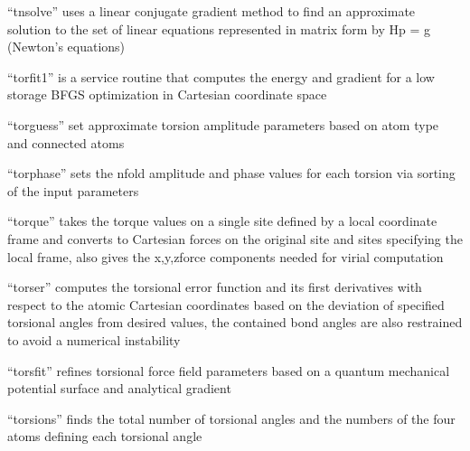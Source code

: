 \documentclass[letterpaper,11pt,english]{sphinxmanual}
\begin{document}
\sphinxAtStartPar
{}

\sphinxAtStartPar
“tnsolve” uses a linear conjugate gradient method to find an approximate solution to the set of linear equations represented in matrix form by Hp = \sphinxhyphen{}g (Newton’s equations)

\sphinxAtStartPar
{}

\sphinxAtStartPar
“torfit1” is a service routine that computes the energy and gradient for a low storage BFGS optimization in Cartesian coordinate space

\sphinxAtStartPar
{}

\sphinxAtStartPar
“torguess” set approximate torsion amplitude parameters based on atom type and connected atoms

\sphinxAtStartPar
{}

\sphinxAtStartPar
“torphase” sets the n\sphinxhyphen{}fold amplitude and phase values for each torsion via sorting of the input parameters

\sphinxAtStartPar
{}

\sphinxAtStartPar
“torque” takes the torque values on a single site defined by a local coordinate frame and converts to Cartesian forces on the original site and sites specifying the local frame, also gives the x,y,z\sphinxhyphen{}force components needed for virial computation

\sphinxAtStartPar
{}

\sphinxAtStartPar
“torser” computes the torsional error function and its first derivatives with respect to the atomic Cartesian coordinates based on the deviation of specified torsional angles from desired values, the contained bond angles are also restrained to avoid a numerical instability

\sphinxAtStartPar
{}

\sphinxAtStartPar
“torsfit” refines torsional force field parameters based on a quantum mechanical potential surface and analytical gradient

\sphinxAtStartPar
{}

\sphinxAtStartPar
“torsions” finds the total number of torsional angles and the numbers of the four atoms defining each torsional angle

\sphinxAtStartPar
{}
\end{document}
